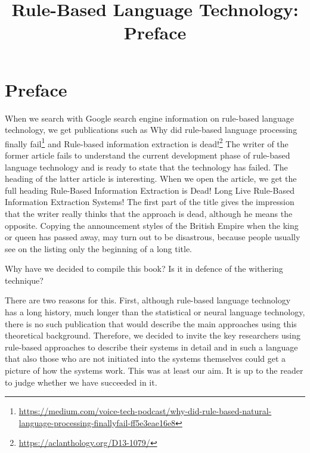 \documentclass[free]{flammie}
\begin{document}
\title{Rule-Based Language Technology: Preface }



\section*{Preface}\label{sec:introduction}

When we search with Google search engine information on rule-based language
technology, we get publications such as Why did rule-based language processing finally
fail\footnote{\url{https://medium.com/voice-tech-podcast/why-did-rule-based-natural-language-processing-finallyfail-ff5e3eae16e8}}
and Rule-based information extraction is
dead!\footnote{\url{https://aclanthology.org/D13-1079/}} The writer of the former article fails
to understand the current development phase of rule-based language technology and is
ready to state that the technology has failed. The heading of the latter article is interesting.
When we open the article, we get the full heading Rule-Based Information Extraction is
Dead! Long Live Rule-Based Information Extraction Systems! The first part of the title
gives the impression that the writer really thinks that the approach is dead, although he
means the opposite. Copying the announcement styles of the British Empire when the
king or queen has passed away, may turn out to be disastrous, because people usually see
on the listing only the beginning of a long title.

Why have we decided to compile this book? Is it in defence of the withering
technique?

There are two reasons for this. First, although rule-based language technology has a
long history, much longer than the statistical or neural language technology, there is no
such publication that would describe the main approaches using this theoretical
background. Therefore, we decided to invite the key researchers using rule-based
approaches to describe their systems in detail and in such a language that also those who
are not initiated into the systems themselves could get a picture of how the systems work.
This was at least our aim. It is up to the reader to judge whether we have succeeded in it.
\end{document}
